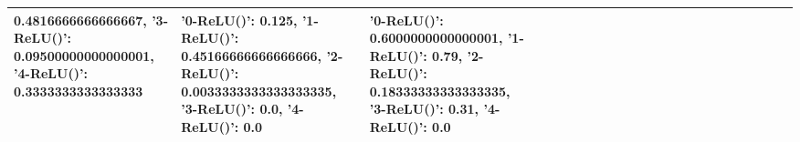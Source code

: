 \begin{tabular}{lllllllllllllllllllllll}
0.4816666666666667, '3-ReLU()': 0.09500000000000001, '4-ReLU()': 0.3333333333333333} & {'0-ReLU()': 0.125, '1-ReLU()': 0.45166666666666666, '2-ReLU()': 0.0033333333333333335, '3-ReLU()': 0.0, '4-ReLU()': 0.0} & {'0-ReLU()': 0.6000000000000001, '1-ReLU()': 0.79, '2-ReLU()': 0.18333333333333335, '3-ReLU()': 0.31, '4-ReLU()': 0.0} \\
\bottomrule
\end{tabular}

